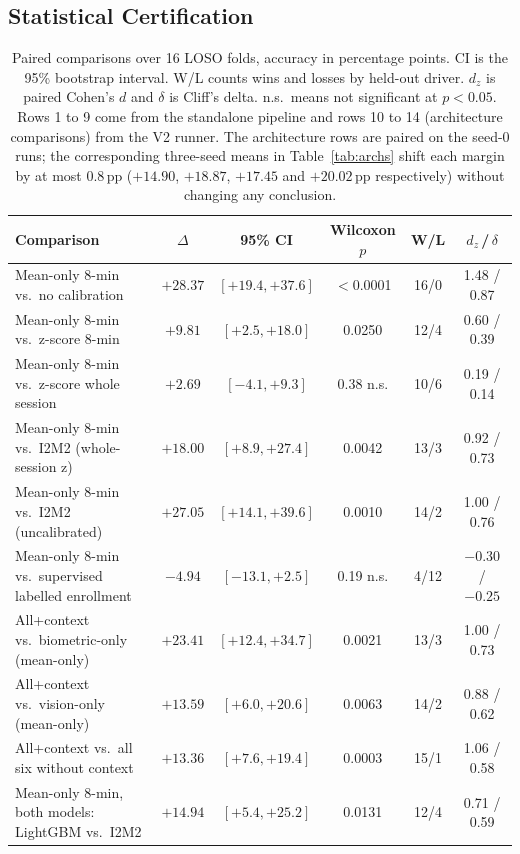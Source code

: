 \documentclass[journal]{IEEEtran}
\newcommand{\pp}{\,pp}
\begin{document}
\subsection{Statistical Certification}
\label{sec:stats}
\begin{table}[!t]
\caption{Paired comparisons over 16 LOSO folds, accuracy in percentage points.
CI is the 95\% bootstrap interval. W/L counts wins and losses by held-out
driver. $d_z$ is paired Cohen's $d$ and $\delta$ is Cliff's delta. n.s.\ means
not significant at $p<0.05$. Rows 1 to 9 come from the standalone pipeline and
rows 10 to 14 (architecture comparisons) from the V2 runner. The
architecture rows are paired on the seed-0 runs; the corresponding three-seed
means in Table~\ref{tab:archs} shift each margin by at most 0.8\pp{}
($+14.90$, $+18.87$, $+17.45$ and $+20.02$\pp{} respectively) without changing
any conclusion.}
\label{tab:stats}
\centering\footnotesize
\begin{tabular}{@{}lccccc@{}}
\toprule
Comparison & $\Delta$ & 95\% CI & Wilcoxon $p$ & W/L & $d_z$\,/\,$\delta$ \\
\midrule
Mean-only 8-min vs.\ no calibration            & $+28.37$ & $[+19.4,+37.6]$ & $<$0.0001 & 16/0 & 1.48 / 0.87 \\
Mean-only 8-min vs.\ z-score 8-min             & $+9.81$  & $[+2.5,+18.0]$  & 0.0250 & 12/4 & 0.60 / 0.39 \\
Mean-only 8-min vs.\ z-score whole session     & $+2.69$  & $[-4.1,+9.3]$   & 0.38 n.s. & 10/6 & 0.19 / 0.14 \\
Mean-only 8-min vs.\ I2M2 (whole-session z)    & $+18.00$ & $[+8.9,+27.4]$  & 0.0042 & 13/3 & 0.92 / 0.73 \\
Mean-only 8-min vs.\ I2M2 (uncalibrated)       & $+27.05$ & $[+14.1,+39.6]$ & 0.0010 & 14/2 & 1.00 / 0.76 \\
Mean-only 8-min vs.\ supervised labelled enrollment & $-4.94$ & $[-13.1,+2.5]$ & 0.19 n.s. & 4/12 & $-0.30$ / $-0.25$ \\
All+context vs.\ biometric-only (mean-only)    & $+23.41$ & $[+12.4,+34.7]$ & 0.0021 & 13/3 & 1.00 / 0.73 \\
All+context vs.\ vision-only (mean-only)       & $+13.59$ & $[+6.0,+20.6]$  & 0.0063 & 14/2 & 0.88 / 0.62 \\
All+context vs.\ all six without context       & $+13.36$ & $[+7.6,+19.4]$  & 0.0003 & 15/1 & 1.06 / 0.58 \\
Mean-only 8-min, both models: LightGBM vs.\ I2M2    & $+14.94$ & $[+5.4,+25.2]$  & 0.0131 & 12/4 & 0.71 / 0.59 \\

\end{tabular}
\end{table}
\end{document}
